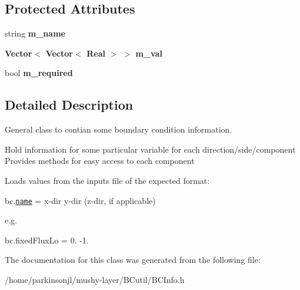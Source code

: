 \subsection*{Protected Attributes}
\begin{DoxyCompactItemize}
\item 
\mbox{\label{class_b_c_info_ae177e9e11b0a02eb989c593bfa05fd00}} 
string {\bfseries m\+\_\+name}
\item 
\mbox{\label{class_b_c_info_ab4e772635bf1be6a439be33c3f7512c4}} 
\textbf{ Vector}$<$ \textbf{ Vector}$<$ \textbf{ Real} $>$ $>$ {\bfseries m\+\_\+val}
\item 
\mbox{\label{class_b_c_info_aec00288afb5aff5982878db5b71522e4}} 
bool {\bfseries m\+\_\+required}
\end{DoxyCompactItemize}


\subsection{Detailed Description}
General class to contian some boundary condition information. 

Hold information for some particular variable for each direction/side/component Provides methods for easy access to each component

Loads values from the inputs file of the expected format\+:

bc.\href{Lo/Hi}{\tt name} = x-\/dir y-\/dir (z-\/dir, if applicable)

e.\+g.

bc.\+fixed\+Flux\+Lo = 0. -\/1. 

The documentation for this class was generated from the following file\+:\begin{DoxyCompactItemize}
\item 
/home/parkinsonjl/mushy-\/layer/\+B\+Cutil/B\+C\+Info.\+h\end{DoxyCompactItemize}
